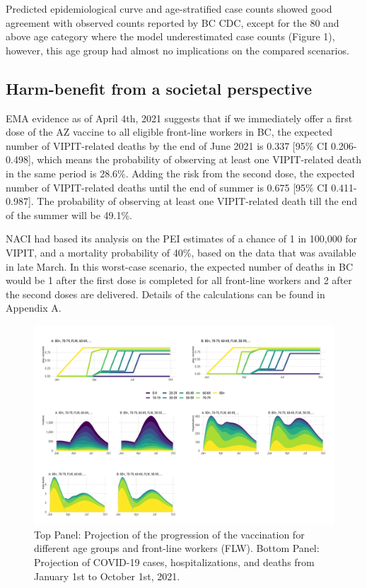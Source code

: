 \documentclass[]{interact}
\theoremstyle{plain}%
\theoremstyle{definition}
\theoremstyle{remark}
\begin{document}
Predicted epidemiological curve and age-stratified case counts showed
good agreement with observed counts reported by BC CDC, except for the
80 and above age category where the model underestimated case counts
(Figure 1), however, this age group had almost no implications on the
compared scenarios.

\hypertarget{harm-benefit-from-a-societal-perspective}{%
\subsection{Harm-benefit from a societal
perspective}\label{harm-benefit-from-a-societal-perspective}}

EMA evidence as of April 4th, 2021 suggests that if we immediately offer
a first dose of the AZ vaccine to all eligible front-line workers in BC,
the expected number of VIPIT-related deaths by the end of June 2021 is
0.337 {[}95\% CI 0.206-0.498{]}, which means the probability of
observing at least one VIPIT-related death in the same period is 28.6\%.
Adding the risk from the second dose, the expected number of
VIPIT-related deaths until the end of summer is 0.675 {[}95\% CI
0.411-0.987{]}. The probability of observing at least one VIPIT-related
death till the end of the summer will be 49.1\%.

NACI had based its analysis on the PEI estimates of a chance of 1 in
100,000 for VIPIT, and a mortality probability of 40\%, based on the
data that was available in late March. In this worst-case scenario, the
expected number of deaths in BC would be 1 after the first dose is
completed for all front-line workers and 2 after the second doses are
delivered. Details of the calculations can be found in Appendix A.

\begin{figure}

{\centering \includegraphics[width=1\linewidth]{../figures/fig-trajectoriesFull} 

}

\caption{Top Panel: Projection of the progression of the vaccination for different age groups and front-line workers (FLW). Bottom Panel: Projection of COVID-19 cases, hospitalizations, and deaths from January 1st to October 1st, 2021.}\label{fig:fig1}
\end{figure}
\end{document}
